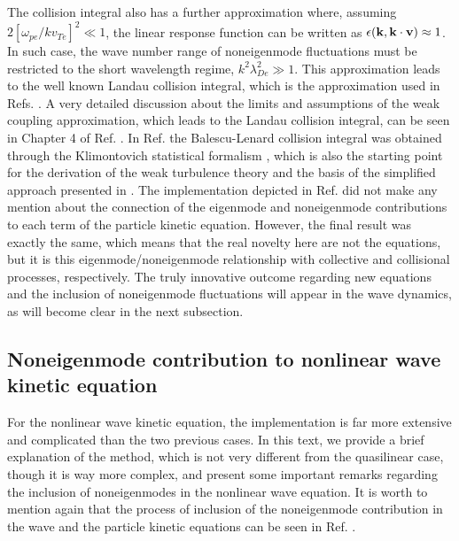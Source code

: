 \documentclass[12pt,a4paper,ruledheader]{report}
\begin{document}
The collision integral also has a further approximation where,
assuming $2[\omega_{pe}/kv_{Te}]^2\ll 1$, the linear response
function can be written as $\epsilon({\bf k},{\bf k \cdot v})
\approx 1$. In such case, the wave number range of noneigenmode
fluctuations must be restricted to the short wavelength regime,
$k^2\lambda_{De}^2\gg 1$. This approximation leads to the well
known Landau collision integral, which is the approximation used
in Refs. \cite{Tigik2016a,Tigik2017a}. A very detailed discussion
about the limits and assumptions of the weak coupling approximation,
which leads to the Landau collision integral,
 can be seen in Chapter
4 of Ref. \cite{Tigik2015}.
In Ref. \cite{Tigik2015} the Balescu-Lenard collision integral was
obtained through the Klimontovich statistical formalism
\cite{klimo,klimon}, which is also the starting point for
the derivation of the weak turbulence theory \cite{YZKS16} and the
basis of the simplified approach presented in .
The implementation depicted in Ref. \cite{Tigik2015} did not make
any mention about the connection of the eigenmode and noneigenmode
contributions to each term of the particle kinetic equation. However,
the final result was exactly the same, which means that
the real novelty
here are not the equations, but it is this eigenmode/noneigenmode
relationship with collective and collisional processes, respectively.
The truly innovative outcome regarding new equations and the inclusion
of noneigenmode fluctuations will appear in the wave dynamics, as will
become clear in the next subsection.


\subsection{Noneigenmode contribution to nonlinear wave kinetic equation}
For the nonlinear wave kinetic equation, the implementation is far more
extensive and complicated than the two previous cases. 
In this text, we provide a brief explanation of the method,
which is not very different from the quasilinear case, though
it is way more complex, and present some important remarks
regarding the inclusion of noneigenmodes in the nonlinear wave
equation. It is worth to mention again that the process of
inclusion of the noneigenmode contribution in the wave and the
particle kinetic equations can be seen in Ref. \cite{YZKS16}.
\end{document}
